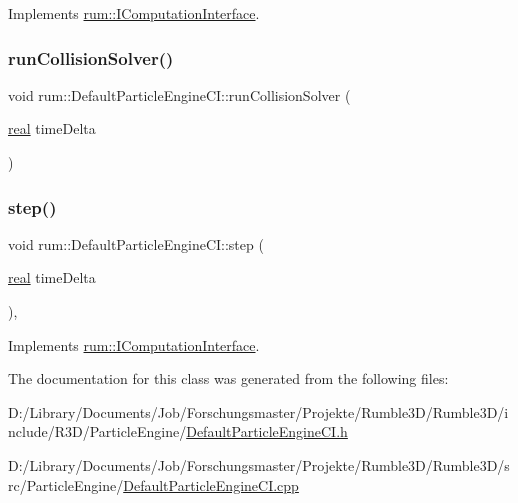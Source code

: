 Implements \mbox{\hyperlink{classrum_1_1_i_computation_interface_a9cff2ff492abd2a4f014aa4f25184c8b}{rum\+::\+I\+Computation\+Interface}}.

\mbox{\label{classrum_1_1_default_particle_engine_c_i_ae816a8ccbd617510ad5f2d39f2075314}} 
\subsubsection{\texorpdfstring{run\+Collision\+Solver()}{runCollisionSolver()}}
{\footnotesize\ttfamily void rum\+::\+Default\+Particle\+Engine\+C\+I\+::run\+Collision\+Solver (\begin{DoxyParamCaption}\item[{\mbox{\hyperlink{namespacerum_a7e8cca23573d5eaead0f138cbaa4862c}{real}}}]{time\+Delta }\end{DoxyParamCaption})\hspace{0.3cm}{\ttfamily [protected]}}

\mbox{\label{classrum_1_1_default_particle_engine_c_i_a1176bc40c952f1be6d61b44bf7eb281c}} 
\subsubsection{\texorpdfstring{step()}{step()}}
{\footnotesize\ttfamily void rum\+::\+Default\+Particle\+Engine\+C\+I\+::step (\begin{DoxyParamCaption}\item[{\mbox{\hyperlink{namespacerum_a7e8cca23573d5eaead0f138cbaa4862c}{real}}}]{time\+Delta }\end{DoxyParamCaption})\hspace{0.3cm}{\ttfamily [override]}, {\ttfamily [virtual]}}



Implements \mbox{\hyperlink{classrum_1_1_i_computation_interface_aa033d368ac4057a52077d6724b94d334}{rum\+::\+I\+Computation\+Interface}}.



The documentation for this class was generated from the following files\+:\begin{DoxyCompactItemize}
\item 
D\+:/\+Library/\+Documents/\+Job/\+Forschungsmaster/\+Projekte/\+Rumble3\+D/\+Rumble3\+D/include/\+R3\+D/\+Particle\+Engine/\mbox{\hyperlink{_default_particle_engine_c_i_8h}{Default\+Particle\+Engine\+C\+I.\+h}}\item 
D\+:/\+Library/\+Documents/\+Job/\+Forschungsmaster/\+Projekte/\+Rumble3\+D/\+Rumble3\+D/src/\+Particle\+Engine/\mbox{\hyperlink{_default_particle_engine_c_i_8cpp}{Default\+Particle\+Engine\+C\+I.\+cpp}}\end{DoxyCompactItemize}

